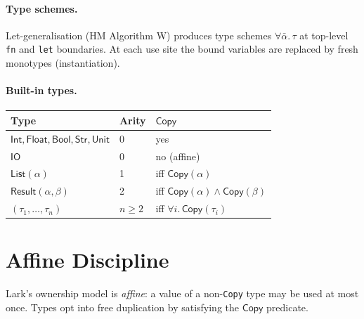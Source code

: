 \documentclass[10pt,a4paper]{article}
\newcommand{\TInt}{\mathsf{Int}}
\newcommand{\TFlt}{\mathsf{Float}}
\newcommand{\TBool}{\mathsf{Bool}}
\newcommand{\TStr}{\mathsf{Str}}
\newcommand{\TUnit}{\mathsf{Unit}}
\newcommand{\TIO}{\mathsf{IO}}
\newcommand{\TCopy}{\mathsf{Copy}}
\theoremstyle{plain}
\theoremstyle{definition}
\theoremstyle{remark}
\begin{document}
\paragraph{Type schemes.}
Let-generalisation (HM Algorithm W) produces type schemes
$\forall\bar\alpha.\,\tau$ at top-level \texttt{fn} and \texttt{let}
boundaries.  At each use site the bound variables are replaced by fresh
monotypes (instantiation).

\paragraph{Built-in types.}
\begin{center}
\renewcommand{\arraystretch}{1.2}
\begin{tabular}{@{}lll@{}}
\toprule
Type & Arity & $\TCopy$ \\
\midrule
$\TInt,\TFlt,\TBool,\TStr,\TUnit$       & 0 & yes \\
$\TIO$                                   & 0 & no (affine) \\
$\mathsf{List}(\alpha)$                  & 1 & iff $\TCopy(\alpha)$ \\
$\mathsf{Result}(\alpha,\beta)$          & 2 & iff $\TCopy(\alpha)\wedge\TCopy(\beta)$ \\
$(\tau_1,\ldots,\tau_n)$                 & $n\ge 2$ & iff $\forall i.\,\TCopy(\tau_i)$ \\
\bottomrule
\end{tabular}
\end{center}

\section{Affine Discipline}
\label{sec:affine}

Lark's ownership model is \emph{affine}: a value of a non-\texttt{Copy} type
may be used at most once.  Types opt into free duplication by satisfying the
$\TCopy$ predicate.
\end{document}
